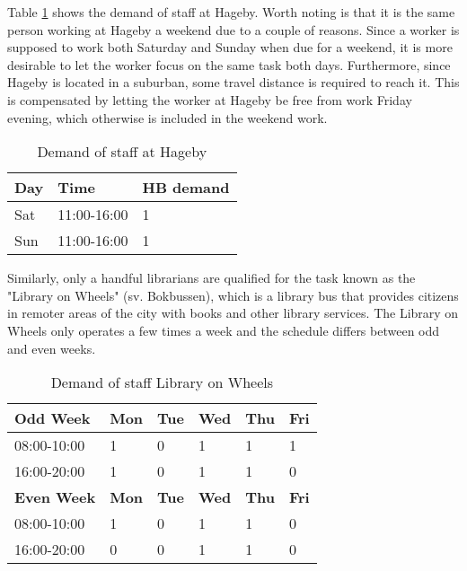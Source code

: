 Table \ref{tab:Hageby_Demand} shows the demand of staff at Hageby. Worth noting is that it is the same person working at Hageby a weekend due to a couple of reasons. Since a worker is supposed to work both Saturday and Sunday when due for a weekend, it is more desirable to let the worker focus on the same task both days. Furthermore, since Hageby is located in a suburban, some travel distance is required to reach it. This is compensated by letting the worker at Hageby be free from work Friday evening, which otherwise is included in the weekend work. 

\begin{table}[H]
\centering
\caption{Demand of staff at Hageby}
\label{tab:Hageby_Demand}
\begin{tabularx}{0.5\textwidth}{|l|l|X|}
\hline
\textbf{Day} & \textbf{Time} & \textbf{HB demand}
\\ \hline 
Sat & 11:00-16:00  & 1 
\\ \hline 
Sun & 11:00-16:00  & 1 
\\ \hline 
\end{tabularx}
\end{table} 

Similarly, only a handful librarians are qualified for the task known as the "Library on Wheels" (sv. Bokbussen), which is a library bus that provides citizens in remoter areas of the city with books and other library services. The Library on Wheels only operates a few times a week and the schedule differs between odd and even weeks.

\begin{table}[!h]
\centering
\caption{Demand of staff Library on Wheels}
\label{tab:LOW_Demand}
\begin{tabularx}{0.80\textwidth}{|l|X|X|X|X|X|}
\hline
 \textbf{Odd Week} & \textbf{Mon} & \textbf{Tue} & \textbf{Wed} & \textbf{Thu} & \textbf{Fri} 
 \\ \hline 
\rowcolor{Gray} 
08:00-10:00 & 1 & 0 & 1 & 1 & 1 
\\ \hline 
\rowcolor{Gray} 
16:00-20:00 & 1 & 0 & 1 & 1 & 0 
\\ \hline 
 \textbf{Even Week} & \textbf{Mon} & \textbf{Tue} & \textbf{Wed} & \textbf{Thu} & \textbf{Fri} 
 \\ \hline 
\rowcolor{Gray} 
08:00-10:00 & 1 & 0 & 1 & 1 & 0 
\\ \hline 
\rowcolor{Gray} 
16:00-20:00 & 0 & 0 & 1 & 1 & 0 
\\ \hline 
\end{tabularx}
\end{table}

